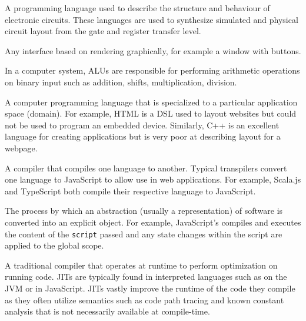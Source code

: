 \begin{definition}
    A programming language used to describe the structure and behaviour of electronic circuits. These languages are used to synthesize simulated and physical circuit layout from the gate and register transfer level\cite{Chu2006}.
\end{definition}

\begin{definition}
    Any interface based on rendering graphically, for example a window with buttons. 
\end{definition}

\begin{definition}
    In a computer system, ALUs are responsible for performing arithmetic operations on binary input such as addition, shifts, multiplication, division.
\end{definition}

\begin{definition}
    A computer programming language that is specialized to a particular application space (domain). For example, HTML is a DSL used to layout websites but could not be used to program an embedded device. Similarly, C++ is an excellent language for creating applications but is very poor at describing layout for a webpage.
\end{definition}

\begin{definition}[Transpiler]
    A compiler that compiles one language to another. Typical transpilers convert one language to JavaScript to allow use in web applications. For example, Scala.js and TypeScript both compile their respective language to JavaScript.
\end{definition}

\begin{definition}[Reification]
    The process by which an abstraction (usually a  representation) of software is converted into an explicit object. For example, JavaScript's  compiles and executes the content of the \verb|script| passed and any state changes within the script are applied to the global scope.
\end{definition}

\begin{definition}
    A traditional compiler that operates at runtime to perform optimization on running code. JITs are typically found in interpreted languages such as on the JVM or in JavaScript. JITs vastly improve the runtime of the code they compile as they often utilize semantics such as code path tracing and known constant analysis that is not necessarily available at compile-time. 
\end{definition}